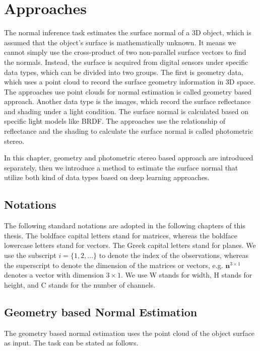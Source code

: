\chapter{Approaches} %

\label{ch:03} %
The normal inference task estimates the surface normal of a 3D object, which is assumed that the object's surface is mathematically unknown. It means we cannot simply use the cross-product of two non-parallel surface vectors to find the normals. Instead, the surface is acquired from digital sensors under specific data types, which can be divided into two groups. The first is geometry data, which uses a point cloud to record the surface geometry information in 3D space. The approaches use point clouds for normal estimation is called geometry based approach.
Another data type is the images, which record the surface reflectance and shading under a light condition. The surface normal is calculated based on specific light models like BRDF. The approaches use the relationship of reflectance and the shading to calculate the surface normal is called photometric stereo.

In this chapter, geometry and photometric stereo based approach are introduced separately, then we introduce a method to estimate the surface normal that utilize both kind of data types based on deep learning approaches.

\section{Notations}

The following standard notations are adopted in the following chapters of this thesis. The boldface capital letters stand for matrices, whereas the boldface lowercase letters stand for vectors. The Greek capital letters stand for planes.
We use the subscript $ i= \{1,2,...\} $ to denote the index of the observations, whereas the superscript to denote the dimension of the matrices or vectors, e.g. $ \textbf{n}^{3\times 1} $ denotes a vector with dimension $ 3\times1 $. We use W stands for width, H stands for height, and C stands for the number of channels.

\section{Geometry based Normal Estimation}

The geometry based normal estimation uses the point cloud of the object surface as input. The task can be stated as follows.

